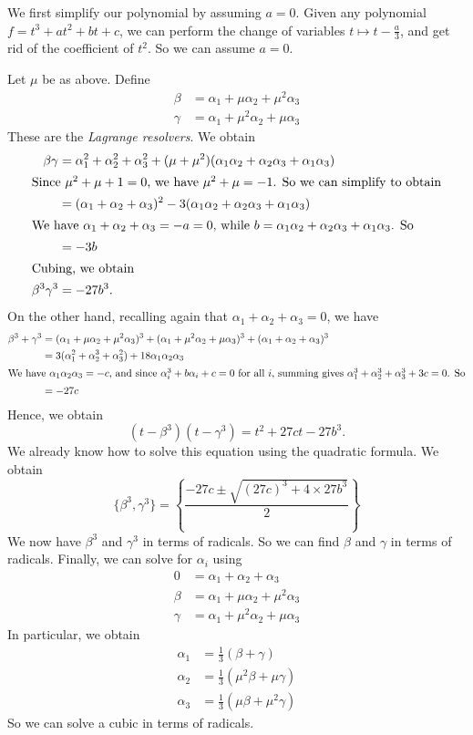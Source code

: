 \documentclass[a4paper]{article}
\begin{document}
We first simplify our polynomial by assuming $a = 0$. Given any polynomial $f = t^3 + at^2 + bt + c$, we can perform the change of variables $t\mapsto t - \frac{a}{3}$, and get rid of the coefficient of $t^2$. So we can assume $a = 0$.

Let $\mu$ be as above. Define
\begin{align*}
  \beta &= \alpha_1 + \mu \alpha_2 + \mu^2 \alpha_3\\
  \gamma &= \alpha_1 + \mu^2 \alpha_2 + \mu \alpha_3
\end{align*}
These are the \emph{Lagrange resolvers}. We obtain
\begin{align*}
  \beta\gamma &= \alpha_1^2 + \alpha_2^2 +\alpha_3^2 + (\mu + \mu^2)(\alpha_1\alpha_2 + \alpha_2\alpha_3 + \alpha_1\alpha_3)\\
  \intertext{Since $\mu^2 + \mu + 1 = 0$, we have $\mu^2 + \mu = -1$. So we can simplify to obtain}
  &= (\alpha_1 + \alpha_2 + \alpha_3)^2 - 3(\alpha_1\alpha_2 + \alpha_2\alpha_3 + \alpha_1\alpha_3)\\
  \intertext{We have $\alpha_1 + \alpha_2 + \alpha_3 = -a = 0$, while $b = \alpha_1\alpha_2 + \alpha_2\alpha_3 + \alpha_1\alpha_3$. So}
  &= -3b\\
  \intertext{Cubing, we obtain}
  \beta^3\gamma^3 &= -27b^3.
\end{align*}
On the other hand, recalling again that $\alpha_1 + \alpha_2 + \alpha_3 = 0$, we have
\begin{align*}
  \beta^3 + \gamma^3 &= (\alpha_1 + \mu \alpha_2 + \mu^2 \alpha_3)^3 + (\alpha_1 + \mu^2\alpha_2 + \mu \alpha_3)^3 + (\alpha_1 + \alpha_2 + \alpha_3)^3\\
  &= 3(\alpha_1^2 + \alpha_2^3 + \alpha_3^2) + 18\alpha_1\alpha_2\alpha_3\\
  \intertext{We have $\alpha_1\alpha_2\alpha_3 = -c$, and since $\alpha_i^3 + b\alpha_i + c = 0$ for all $i$, summing gives $\alpha_1^3 +  \alpha_2^3 + \alpha_3^3 + 3c = 0$. So}
  &= -27c
\end{align*}
Hence, we obtain
\[
  (t - \beta^3)(t - \gamma^3) = t^2 + 27ct - 27b^3.
\]
We already know how to solve this equation using the quadratic formula. We obtain
\[
  \{\beta^3, \gamma^3\} = \left\{\frac{-27 c \pm \sqrt{(27c)^3 + 4\times 27b^3}}{2}\right\}
\]
We now have $\beta^3$ and $\gamma^3$ in terms of radicals. So we can find $\beta$ and $\gamma$ in terms of radicals. Finally, we can solve for $\alpha_i$ using
\begin{align*}
  0 &= \alpha_1 + \alpha_2 + \alpha_3\\
  \beta &= \alpha_1 + \mu \alpha_2 + \mu^2 \alpha_3\\
  \gamma &= \alpha_1 + \mu^2 \alpha_2 + \mu \alpha_3
\end{align*}
In particular, we obtain
\begin{align*}
  \alpha_1 &= \frac{1}{3}(\beta + \gamma)\\
  \alpha_2 &= \frac{1}{3}(\mu^2 \beta + \mu \gamma)\\
  \alpha_3 &= \frac{1}{3}(\mu \beta + \mu^2 \gamma)
\end{align*}
So we can solve a cubic in terms of radicals.
\end{document}
